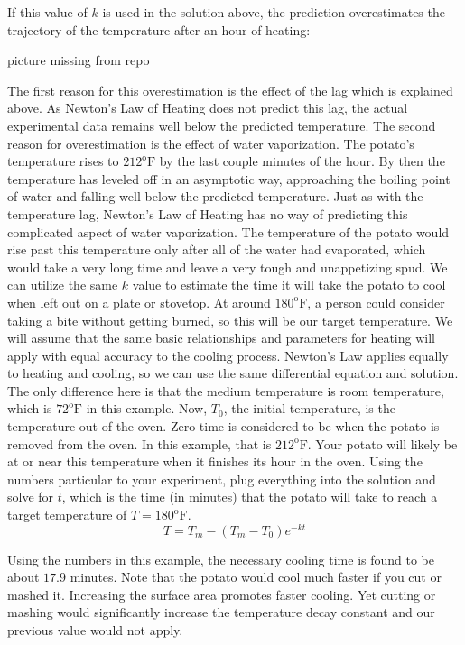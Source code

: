 \documentclass{ximera}
\begin{document}
If this value of $k$ is used in the solution above, the prediction overestimates the trajectory of the temperature after an hour of heating:
 
\begin{image}
picture missing from repo
\end{image}
 
The first reason for this overestimation is the effect of the lag which is explained above.  As Newton's Law of Heating does not predict this lag, the actual experimental data remains well below the predicted temperature.  The second reason for overestimation is the effect of water vaporization.  The potato's temperature rises to $212^{\text{o}}\text{F}$ by the last couple minutes of the hour.  By then the temperature has leveled off in an asymptotic way, approaching the boiling point of water and falling well below the predicted temperature.  Just as with the temperature lag, Newton's Law of Heating has no way of predicting this complicated aspect of water vaporization.  The temperature of the potato would rise past this temperature only after all of the water had evaporated, which would take a very long time and leave a very tough and unappetizing spud.
We can utilize the same $k$ value to estimate the time it will take the potato to cool when left out on a plate or stovetop.  At around $180^{\text{o}}\text{F}$, a person could consider taking a bite without getting burned, so this will be our target temperature.  We will assume that the same basic relationships and parameters for heating will apply with equal accuracy to the cooling process.  Newton's Law applies equally to heating and cooling, so we can use the same differential equation and solution.  The only difference here is that the medium temperature  is room temperature, which is $72^{\text{o}}\text{F}$ in this example.  Now, $T_0$, the initial temperature, is the temperature out of the oven.  Zero time is considered to be when the potato is removed from the oven.  In this example, that is $212^{\text{o}}\text{F}$.  Your potato will likely be at or near this temperature when it finishes its hour in the oven.  Using the numbers particular to your experiment, plug everything into the solution and solve for $t$, which is the time (in minutes) that the potato will take to reach a target temperature of $T=180^{\text{o}}\text{F}$.
\[
T = T_m-(T_m-T_0)e^{-kt}
\]
 
Using the numbers in this example, the necessary cooling time is found to be about $17.9$ minutes.  Note that the potato would cool much faster if you cut or mashed it.  Increasing the surface area promotes faster cooling.  Yet cutting or mashing would significantly increase the temperature decay constant and our previous value would not apply.
 
\end{document}
